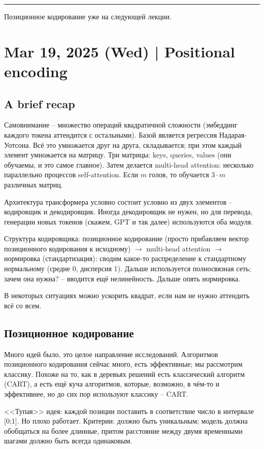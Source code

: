\documentclass[a4paper,12pt]{article}
\begin{document}
\hrule

Позиционное кодирование уже на следующей лекции.

\section{ Mar 19, 2025 (Wed) | Positional encoding }
\subsection{ A brief recap }

Самовнимание -- множество операций квадратичной сложности (эмбеддинг каждого токена аттендится с остальными).
Базой является регрессия Надарая-Уотсона.
Всё это умножается друг на друга, складывается; при этом каждый элемент умножается на матрицу.
Три матрицы: keys, queries, values (они обучаемы, и это самое главное).
Затем делается multi-head attention: несколько параллельно процессов self-attention.
Если $ m $ голов, то обучается $ 3 \cdot m $ различных матриц.

Архитектура трансформера условно состоит условно из двух элементов -- кодировщик и декодировщик.
Иногда декодировщик не нужен, но для перевода, генерации новых токенов (скажем, GPT и так далее) используются оба модуля.

Структура кодировщика:
позиционное кодирование (просто прибавляем вектор позиционного кодирования к исходному) $ \to $ multi-head attention $ \to $ нормировка (стандартизация): сводим какое-то распределение к стандартному нормальному (средне 0, дисперсия 1).
Дальше используется полносвязная сеть; зачем она нужна? -- вводится ещё нелинейность.
Дальше опять нормировка.

В некоторых ситуациях можно ускорить квадрат, если нам не нужно аттендить всё со всем.


\subsection{Позиционное кодирование}

Много идей было, это целое направление исследований.
Алгоритмов позиционного кодирования сейчас много, есть эффективные; мы рассмотрим классику.
Похоже на то, как в деревьях решений есть классический алгоритм (CART), а есть ещё куча алгоритмов, которые, возможно, в чём-то и эффективнее, но до сих пор используют классику -- CART.

<<Тупая>> идея: каждой позиции поставить в соответствие число в интервале [0;1].
Но плохо работает.
Критерии: должно быть уникальным; модель должна обобщаться на более длинные, притом расстояние между двумя временными шагами должно быть всегда одинаковым.
\end{document}
